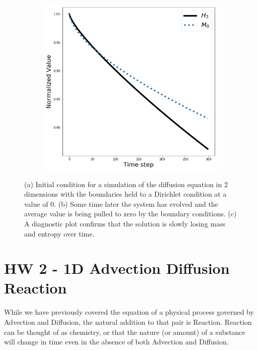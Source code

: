 \documentclass[]{article}
\begin{document}
\begin{figure}
\begin{subfigure}{.5\textwidth}
		\caption{}
	\end{subfigure}
	\begin{subfigure}{.5\textwidth}
		\centering
		\includegraphics[width=.8\linewidth]{figures/2D_Diffusion_DirBound0.png}
		\caption{}
	\end{subfigure}
	\caption{(a) Initial condition for a simulation of the diffusion equation in 2 dimensions with the boundaries held to a Dirichlet condition at a value of 0. (b) Some time later the system has evolved and the average value is being pulled to zero by the boundary conditions. (c) A diagnostic plot confirms that the solution is slowly losing mass and entropy over time.}
	\label{fig:2D}
\end{figure}
 

\section{HW 2 - 1D Advection Diffusion Reaction }
While we have previously covered the equation of a physical process governed by Advection and Diffusion, the natural addition to that pair is Reaction. Reaction can be thought of as chemistry, or that the nature (or amount) of a substance will change in time even in the absence of both Advection and Diffusion.
\end{document}
